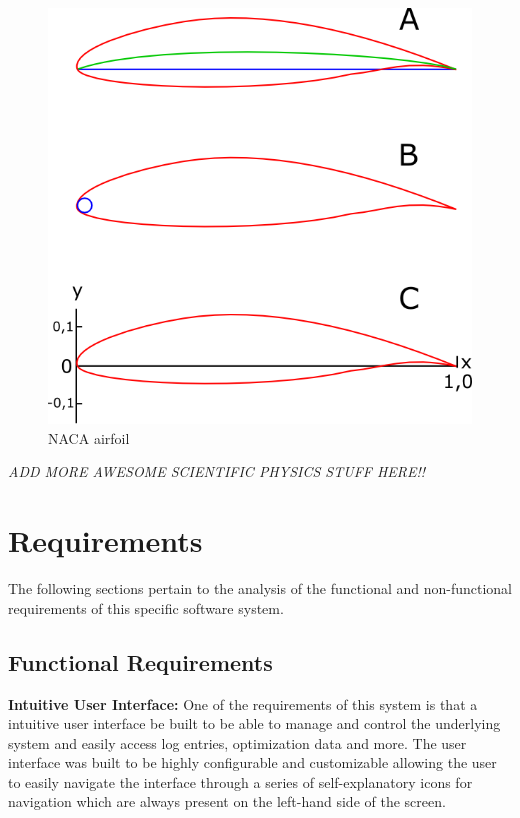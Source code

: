 \documentclass{article}
\begin{document}
\begin{figure}[h!]
\centering
\includegraphics[scale=0.15]{airfoil.png}
\caption{NACA airfoil \cite{airfoil_wikipedia}}
\label{fig:nacaairfoil}
\end{figure}


\textit{ADD MORE AWESOME SCIENTIFIC PHYSICS STUFF HERE!!}


\section{Requirements}

The following sections pertain to the analysis of the functional and non-functional requirements of this specific software system.

\subsection{Functional Requirements}


\par
\textbf{Intuitive User Interface:}
One of the requirements of this system is that a intuitive user interface be built to be able to manage and control the underlying system and easily access log entries, optimization data and more. The user interface was built to be highly configurable and customizable allowing the user to easily navigate the interface through a series of self-explanatory icons for navigation which are always present on the left-hand side of the screen.\\\par
\end{document}
